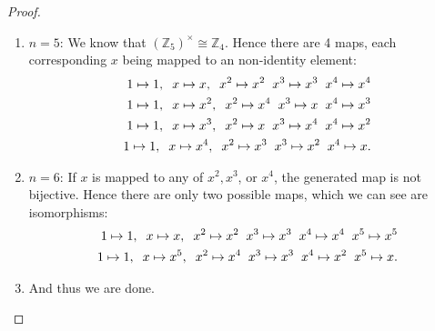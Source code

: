 \documentclass[12pt]{article}
\theoremstyle{remark}
\theoremstyle{named}
\begin{document}
\begin{proof}
\begin{enumerate}
        \item[]\(n = 5\): We know that \((\mathbb Z_5)^\times \cong \mathbb Z_4\). Hence there are 4 maps, each corresponding \(x\) being mapped to an non-identity element:
        \begin{align*}
            1 \mapsto 1, \hspace{2mm} x \mapsto x, \hspace{2mm} x^2 \mapsto x^2 \hspace{2mm} x^3 \mapsto x^3 \hspace{2mm} x^4 \mapsto x^4 \\
            1 \mapsto 1, \hspace{2mm} x \mapsto x^2, \hspace{2mm} x^2 \mapsto x^4 \hspace{2mm} x^3 \mapsto x \hspace{2mm} x^4 \mapsto x^3 \\
            1 \mapsto 1, \hspace{2mm} x \mapsto x^3, \hspace{2mm} x^2 \mapsto x \hspace{2mm} x^3 \mapsto x^4 \hspace{2mm} x^4 \mapsto x^2 \\
            1 \mapsto 1, \hspace{2mm} x \mapsto x^4, \hspace{2mm} x^2 \mapsto x^3 \hspace{2mm} x^3 \mapsto x^2 \hspace{2mm} x^4 \mapsto x.
        \end{align*} 
        
        \item[]\(n = 6\): If \(x\) is mapped to any of \(x^2, x^3\), or \(x^4\), the generated map is not bijective. Hence there are only two possible maps, which we can see are isomorphisms:
        \begin{align*}
            1 \mapsto 1, \hspace{2mm} x \mapsto x, \hspace{2mm} x^2 \mapsto x^2 \hspace{2mm} x^3 \mapsto x^3 \hspace{2mm} x^4 \mapsto x^4 \hspace{2mm} x^5 \mapsto x^5 \\
            1 \mapsto 1, \hspace{2mm} x \mapsto x^5, \hspace{2mm} x^2 \mapsto x^4 \hspace{2mm} x^3 \mapsto x^3 \hspace{2mm} x^4 \mapsto x^2 \hspace{2mm} x^5 \mapsto x.
        \end{align*} 
        \item[] And thus we are done.
    \end{enumerate}
\end{proof}
\end{document}
